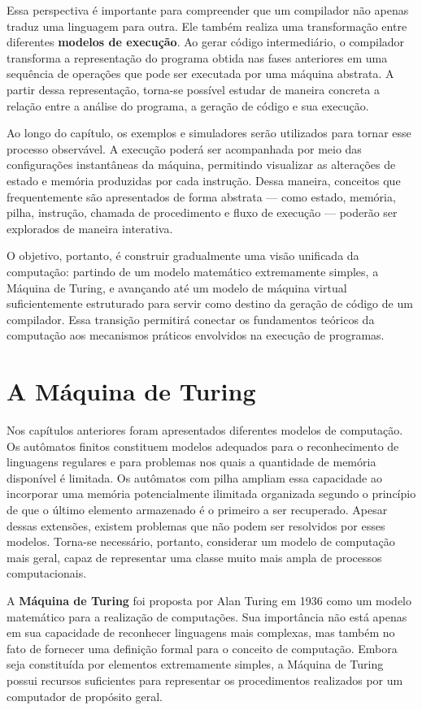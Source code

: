 \documentclass[
  brazilian,
  letterpaper,
]{book}
\theoremstyle{plain}
\theoremstyle{definition}
\theoremstyle{remark}
\begin{document}
Essa perspectiva é importante para compreender que um compilador não
apenas traduz uma linguagem para outra. Ele também realiza uma
transformação entre diferentes \textbf{modelos de execução}. Ao gerar
código intermediário, o compilador transforma a representação do
programa obtida nas fases anteriores em uma sequência de operações que
pode ser executada por uma máquina abstrata. A partir dessa
representação, torna-se possível estudar de maneira concreta a relação
entre a análise do programa, a geração de código e sua execução.

Ao longo do capítulo, os exemplos e simuladores serão utilizados para
tornar esse processo observável. A execução poderá ser acompanhada por
meio das configurações instantâneas da máquina, permitindo visualizar as
alterações de estado e memória produzidas por cada instrução. Dessa
maneira, conceitos que frequentemente são apresentados de forma abstrata
--- como estado, memória, pilha, instrução, chamada de procedimento e
fluxo de execução --- poderão ser explorados de maneira interativa.

O objetivo, portanto, é construir gradualmente uma visão unificada da
computação: partindo de um modelo matemático extremamente simples, a
Máquina de Turing, e avançando até um modelo de máquina virtual
suficientemente estruturado para servir como destino da geração de
código de um compilador. Essa transição permitirá conectar os
fundamentos teóricos da computação aos mecanismos práticos envolvidos na
execução de programas.

\section{A Máquina de Turing}\label{a-muxe1quina-de-turing}

Nos capítulos anteriores foram apresentados diferentes modelos de
computação. Os autômatos finitos constituem modelos adequados para o
reconhecimento de linguagens regulares e para problemas nos quais a
quantidade de memória disponível é limitada. Os autômatos com pilha
ampliam essa capacidade ao incorporar uma memória potencialmente
ilimitada organizada segundo o princípio de que o último elemento
armazenado é o primeiro a ser recuperado. Apesar dessas extensões,
existem problemas que não podem ser resolvidos por esses modelos.
Torna-se necessário, portanto, considerar um modelo de computação mais
geral, capaz de representar uma classe muito mais ampla de processos
computacionais.

A \textbf{Máquina de Turing} foi proposta por Alan Turing em 1936 como
um modelo matemático para a realização de computações. Sua importância
não está apenas em sua capacidade de reconhecer linguagens mais
complexas, mas também no fato de fornecer uma definição formal para o
conceito de computação. Embora seja constituída por elementos
extremamente simples, a Máquina de Turing possui recursos suficientes
para representar os procedimentos realizados por um computador de
propósito geral.
\end{document}
